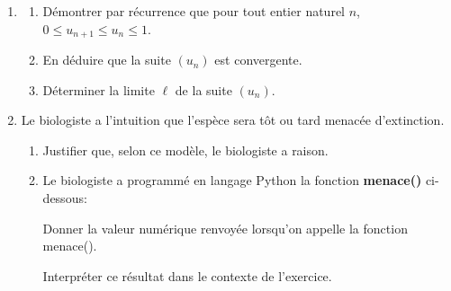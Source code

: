 \documentclass[10pt]{article}
\begin{document}
\begin{enumerate}[resume]
\item 
	\begin{enumerate}
		\item Démontrer par récurrence que pour tout entier naturel $n$,\, $0 \leqslant u_{n+1} \leqslant  u_n \leqslant 1$.
		\item En déduire que la suite $\left(u_n\right)$ est convergente.
		\item Déterminer la limite $\ell$ de la suite $\left(u_n\right)$.
	\end{enumerate}
\item Le biologiste a l'intuition que l'espèce sera tôt ou tard menacée d'extinction.
	\begin{enumerate}
		\item Justifier que, selon ce modèle, le biologiste a raison.
		\item Le biologiste a programmé en langage Python la fonction \textbf{menace()} ci-dessous:

\begin{center}
\end{center}

Donner la valeur numérique renvoyée lorsqu'on appelle la fonction menace(). 

Interpréter ce résultat dans le contexte de l'exercice.
	\end{enumerate}
\end{enumerate}

\bigskip
\end{document}
